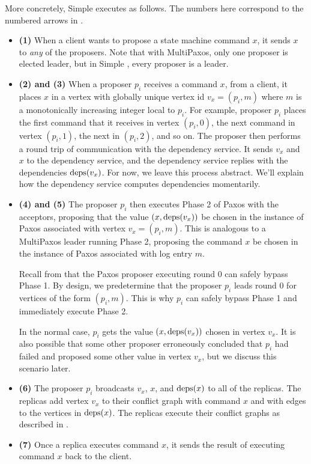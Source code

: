 More concretely, Simple \BPaxos{} executes as follows. The numbers here
correspond to the numbered arrows in .
\begin{itemize}
  \item \textbf{(1)}
    When a client wants to propose a state machine command $x$, it sends $x$ to
    \emph{any} of the proposers. Note that with MultiPaxos, only one proposer
    is elected leader, but in Simple \BPaxos{}, every proposer is a leader.

  \item \textbf{(2) and (3)}
    When a proposer $p_i$ receives a command $x$, from a client, it places $x$
    in a vertex with globally unique vertex id $v_x = (p_i, m)$ where $m$ is a
    monotonically increasing integer local to $p_i$. For example, proposer
    $p_i$ places the first command that it receives in vertex $(p_i, 0)$, the
    next command in vertex $(p_i, 1)$, the next in $(p_i, 2)$, and so on. The
    proposer then performs a round trip of communication with the dependency
    service. It sends $v_x$ and $x$ to the dependency service, and the
    dependency service replies with the dependencies $\text{deps}(v_x)$. For now, we
    leave this process abstract. We'll explain how the dependency service
    computes dependencies momentarily.

  \item \textbf{(4) and (5)}
    The proposer $p_i$ then executes Phase 2 of Paxos with the acceptors,
    proposing that the value $(x, \text{deps}(v_x))$ be chosen in the instance of
    Paxos associated with vertex $v_x = (p_i, m)$. This is analogous to a
    MultiPaxos leader running Phase 2, proposing the command $x$ be chosen in
    the instance of Paxos associated with log entry $m$.

    Recall from  that the Paxos proposer executing round 0
    can safely bypass Phase 1. By design, we predetermine that the proposer
    $p_i$ leads round $0$ for vertices of the form $(p_i, m)$. This is why
    $p_i$ can safely bypass Phase 1 and immediately execute Phase 2.

    In the normal case, $p_i$ gets the value $(x, \text{deps}(v_x))$ chosen in vertex
    $v_x$. It is also possible that some other proposer erroneously concluded
    that $p_i$ had failed and proposed some other value in vertex $v_x$, but we
    discuss this scenario later.

  \item \textbf{(6)}
    The proposer $p_i$ broadcasts $v_x$, $x$, and $\text{deps}(x)$ to all of the
    replicas. The replicas add vertex $v_x$ to their conflict graph with
    command $x$ and with edges to the vertices in $\text{deps}(x)$. The replicas
    execute their conflict graphs as described in .

  \item \textbf{(7)}
    Once a replica executes command $x$, it sends the result of executing
    command $x$ back to the client.
\end{itemize}

